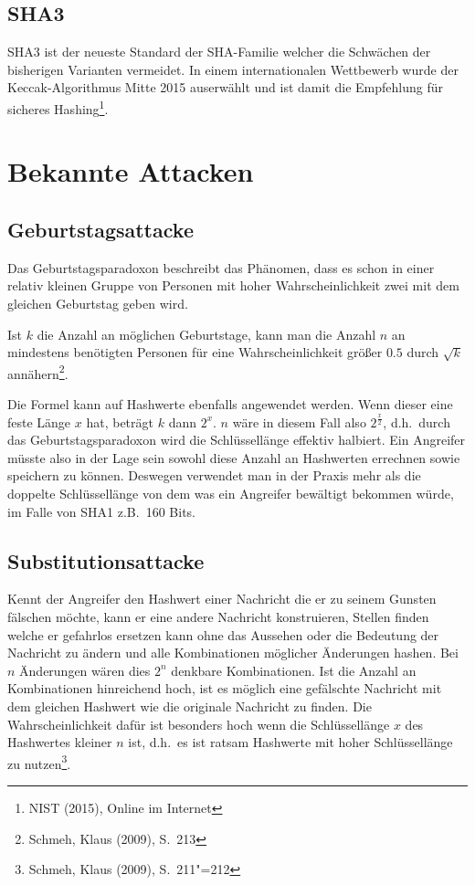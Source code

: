 \subsection{\ac{SHA3}}

SHA3 ist der neueste Standard der SHA-Familie welcher die Schwächen
der bisherigen Varianten vermeidet.  In einem internationalen
Wettbewerb wurde der Keccak-Algorithmus Mitte 2015 auserwählt und ist
damit die Empfehlung für sicheres Hashing\footnote{NIST (2015), Online
  im Internet}.

\section{Bekannte Attacken}

\subsection{Geburtstagsattacke}

Das Geburtstagsparadoxon beschreibt das Phänomen, dass es schon in
einer relativ kleinen Gruppe von Personen mit hoher Wahrscheinlichkeit
zwei mit dem gleichen Geburtstag geben wird.

Ist $k$ die Anzahl an möglichen Geburtstage, kann man die Anzahl $n$
an mindestens benötigten Personen für eine Wahrscheinlichkeit größer
$0.5$ durch $\sqrt{k}$ annähern\footnote{Schmeh, Klaus (2009),
  S.~213}.

Die Formel kann auf Hashwerte ebenfalls angewendet werden.  Wenn
dieser eine feste Länge $x$ hat, beträgt $k$ dann $2^x$.  $n$ wäre in
diesem Fall also $2^{\frac{x}{2}}$, d.h.~durch das
Geburtstagsparadoxon wird die Schlüssellänge effektiv halbiert.  Ein
Angreifer müsste also in der Lage sein sowohl diese Anzahl an
Hashwerten errechnen sowie speichern zu können.  Deswegen verwendet
man in der Praxis mehr als die doppelte Schlüssellänge von dem was ein
Angreifer bewältigt bekommen würde, im Falle von SHA1 z.B.~160 Bits.

\subsection{Substitutionsattacke}

Kennt der Angreifer den Hashwert einer Nachricht die er zu seinem
Gunsten fälschen möchte, kann er eine andere Nachricht konstruieren,
Stellen finden welche er gefahrlos ersetzen kann ohne das Aussehen
oder die Bedeutung der Nachricht zu ändern und alle Kombinationen
möglicher Änderungen hashen.  Bei $n$ Änderungen wären dies $2^n$
denkbare Kombinationen.  Ist die Anzahl an Kombinationen hinreichend
hoch, ist es möglich eine gefälschte Nachricht mit dem gleichen
Hashwert wie die originale Nachricht zu finden.  Die
Wahrscheinlichkeit dafür ist besonders hoch wenn die Schlüssellänge
$x$ des Hashwertes kleiner $n$ ist, d.h.~es ist ratsam Hashwerte mit
hoher Schlüssellänge zu nutzen\footnote{Schmeh, Klaus (2009),
  S.~211"=212}.

